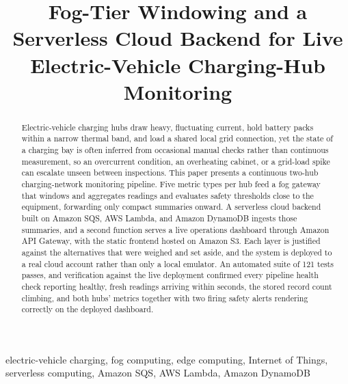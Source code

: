 \documentclass[conference]{IEEEtran}
\begin{document}
\title{Fog-Tier Windowing and a Serverless Cloud Backend for Live Electric-Vehicle Charging-Hub Monitoring}

\author{
}

\maketitle

\begin{abstract}
Electric-vehicle charging hubs draw heavy, fluctuating current, hold battery packs within a narrow thermal band, and load a shared local grid connection, yet the state of a charging bay is often inferred from occasional manual checks rather than continuous measurement, so an overcurrent condition, an overheating cabinet, or a grid-load spike can escalate unseen between inspections. This paper presents a continuous two-hub charging-network monitoring pipeline. Five metric types per hub feed a fog gateway that windows and aggregates readings and evaluates safety thresholds close to the equipment, forwarding only compact summaries onward. A serverless cloud backend built on Amazon SQS, AWS Lambda, and Amazon DynamoDB ingests those summaries, and a second function serves a live operations dashboard through Amazon API Gateway, with the static frontend hosted on Amazon S3. Each layer is justified against the alternatives that were weighed and set aside, and the system is deployed to a real cloud account rather than only a local emulator. An automated suite of 121 tests passes, and verification against the live deployment confirmed every pipeline health check reporting healthy, fresh readings arriving within seconds, the stored record count climbing, and both hubs' metrics together with two firing safety alerts rendering correctly on the deployed dashboard.
\end{abstract}

\begin{IEEEkeywords}
electric-vehicle charging, fog computing, edge computing, Internet of Things, serverless computing, Amazon SQS, AWS Lambda, Amazon DynamoDB
\end{IEEEkeywords}
\end{document}
